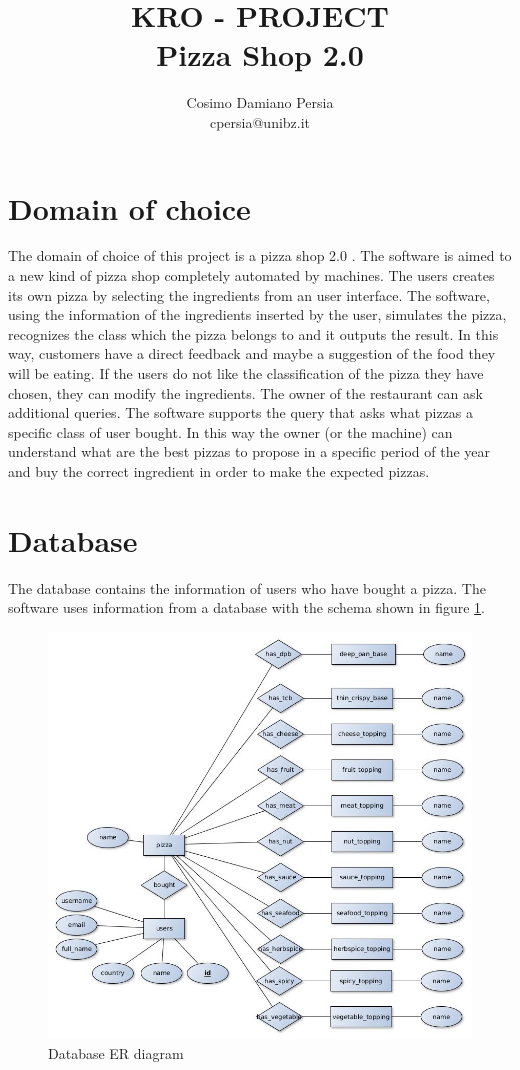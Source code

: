 \documentclass[10pt,a4paper]{article}
\author{Cosimo Damiano Persia\\cpersia@unibz.it}
\title{KRO - PROJECT\\Pizza Shop 2.0}
\begin{document}
\maketitle
\section*{Domain of choice}
The domain of choice of this project is a pizza shop 2.0 . The software is aimed to a new kind of pizza shop completely automated by machines. The users creates its own pizza by selecting the ingredients from an user interface.  The software, using the information of the ingredients inserted by the user, simulates the pizza, recognizes the class which the pizza belongs to and it outputs the result. In this way, customers have a direct feedback and maybe a suggestion of the food they will be eating. If the users do not like the classification of the pizza they have chosen, they can modify the ingredients. 
The owner of the restaurant can ask additional queries. The software supports the query that asks what pizzas a specific class of user bought. In this way the owner (or the machine) can understand what are the best pizzas to propose in a specific period of the year and buy the correct ingredient in order to make the expected pizzas. 


\section*{Database}
The database contains the information of users who have bought a pizza.
The software uses information from a database with the schema shown in figure \ref{DBSCHEMA}.

\begin{figure}
  \includegraphics[width=\linewidth]{database_schema.jpg}
  \caption{Database ER diagram}
  \label{DBSCHEMA}
\end{figure}
\end{document}
